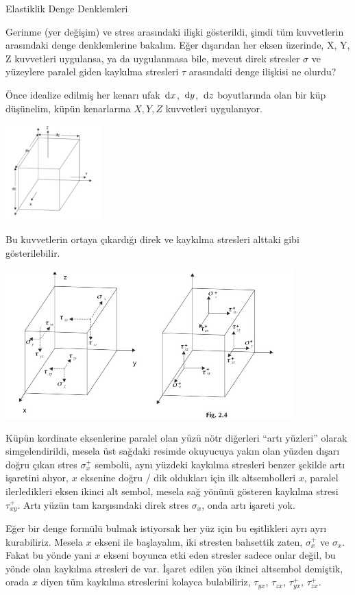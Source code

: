 \documentclass[12pt,fleqn]{article}\usepackage{../../common}
\begin{document}
Elastiklik Denge Denklemleri

Gerinme (yer değişim) ve stres arasındaki ilişki gösterildi, şimdi tüm
kuvvetlerin arasındaki denge denklemlerine bakalım. Eğer dışarıdan her eksen
üzerinde, X, Y, Z kuvvetleri uygulansa, ya da uygulanmasa bile, mevcut direk
stresler $\sigma$ ve yüzeylere paralel giden kaykılma stresleri $\tau$
arasındaki denge ilişkisi ne olurdu?

Önce idealize edilmiş her kenarı ufak $\,\mathrm{d} x$, $\,\mathrm{d} y$, $\,\mathrm{d} z$ boyutlarında
olan bir küp düşünelim, küpün kenarlarına $X,Y,Z$ kuvvetleri uygulanıyor.

\includegraphics[width=10em]{equilibrium_stress2.jpg}

Bu kuvvetlerin ortaya çıkardığı direk ve kaykılma stresleri alttaki gibi
gösterilebilir.

\includegraphics[width=30em]{equilibrium_stress1.jpg}

Küpün kordinate eksenlerine paralel olan yüzü nötr diğerleri ``artı yüzleri''
olarak simgelendirildi, mesela üst sağdaki resimde okuyucuya yakın olan yüzden
dışarı doğru çıkan stres $\sigma_x^+$ sembolü, aynı yüzdeki kaykılma stresleri
benzer şekilde artı işaretini alıyor, $x$ eksenine doğru / dik oldukları için
ilk altsembolleri $x$, paralel ilerledikleri eksen ikinci alt sembol, mesela sağ
yönünü gösteren kaykılma stresi $\tau_{xy}^+$. Artı yüzün tam karşısındaki direk
stres $\sigma_x$, onda artı işareti yok.

Eğer bir denge formülü bulmak istiyorsak her yüz için bu eşitlikleri ayrı ayrı
kurabiliriz. Mesela $x$ ekseni ile başlayalım, iki stresten bahsettik zaten,
$\sigma_x^+$ ve $\sigma_x$. Fakat bu yönde yani $x$ ekseni boyunca etki eden
stresler sadece onlar değil, bu yönde olan kaykılma stresleri de var. İşaret
edilen yön ikinci altsembol demiştik, orada $x$ diyen tüm kaykılma streslerini
kolayca bulabiliriz, $\tau_{yx}$, $\tau_{zx}$, $\tau_{yx}^+$, $\tau_{zx}^+$.
\end{document}
